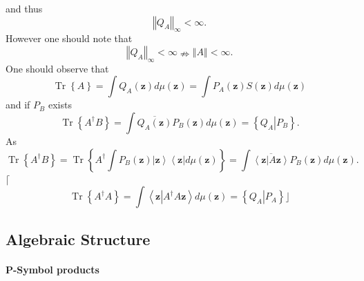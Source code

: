 \documentclass[aps,preprint]{revtex4}%
\begin{document}
and thus
\begin{equation}
\left\Vert Q_{A}\right\Vert _{\infty}<\infty.
\end{equation}
However one should note that
\begin{equation}
\left\Vert Q_{A}\right\Vert _{\infty}<\infty\nRightarrow\left\Vert
A\right\Vert <\infty.
\end{equation}
One should observe that
\begin{equation}
\operatorname*{Tr}\left\{  A\right\}  =\int Q_{A}\left(  \mathbf{z}\right)
d\mu\left(  \mathbf{z}\right)  =\int P_{A}\left(  \mathbf{z}\right)  S\left(
\mathbf{z}\right)  d\mu\left(  \mathbf{z}\right)
\end{equation}
and if $P_{B}$ exists
\begin{equation}
\operatorname*{Tr}\left\{  A^{\dagger}B\right\}  =\int\overline{Q_{A}\left(
\mathbf{z}\right)  }P_{B}\left(  \mathbf{z}\right)  d\mu\left(  \mathbf{z}%
\right)  =\left\{  \left.  Q_{A}\right\vert P_{B}\right\}  .
\end{equation}
As
\begin{equation}
\operatorname*{Tr}\left\{  A^{\dagger}B\right\}  =\operatorname*{Tr}\left\{
A^{\dagger}\int P_{B}\left(  \mathbf{z}\right)  \left\vert \mathbf{z}%
\right\rangle \left\langle \mathbf{z}\right\vert d\mu\left(  \mathbf{z}%
\right)  \right\}  =\int\overline{\left\langle \mathbf{z}\left\vert
A\mathbf{z}\right.  \right\rangle }P_{B}\left(  \mathbf{z}\right)  d\mu\left(
\mathbf{z}\right)  .
\end{equation}
$\lceil$%
\begin{equation}
\operatorname*{Tr}\left\{  A^{\dagger}A\right\}  =\int\left\langle
\mathbf{z}\left\vert A^{\dagger}A\mathbf{z}\right.  \right\rangle d\mu\left(
\mathbf{z}\right)  =\left\{  \left.  Q_{A}\right\vert P_{A}\right\}  \rfloor
\end{equation}


\subsection{Algebraic Structure}

\paragraph{P-Symbol products}%
\end{document}
